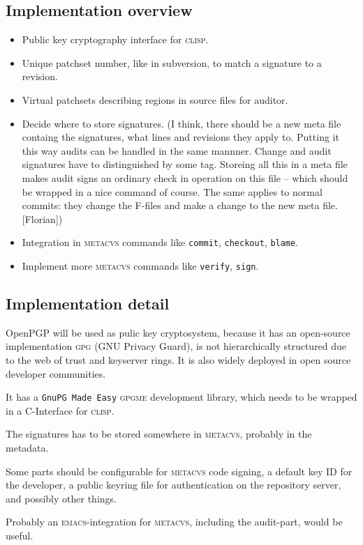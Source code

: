 \documentclass[fleqn, german, 10pt, a4paper]{article}
\begin{document}
\subsection{Implementation overview}
\begin{itemize}
\item Public key cryptography interface for \textsc{clisp}.
\item Unique patchset number, like in subversion, to match a signature to a revision.
\item Virtual patchsets describing regions in source files for auditor.
\item Decide where to store signatures.
(I think, there should be a new meta file containg the signatures, what
lines and revisions they apply to. Putting it this way audits can be handled
in the same mannner. Change and audit signatures have to distinguished by
some tag. Storeing all this in a meta file makes audit signs an
ordinary check in operation on this file -- which should be wrapped in
a nice command of course. The same applies to normal commits: they
change the F-files and make a change to the new meta file. [Florian])
\item Integration in \textsc{metacvs} commands like \texttt{commit},
\texttt{checkout}, \texttt{blame}.
\item Implement more \textsc{metacvs} commands like \texttt{verify},
\texttt{sign}.
\end{itemize}

\subsection{Implementation detail}
OpenPGP will be used as pulic key cryptosystem, because it has an
open-source implementation \textsc{gpg} (GNU Privacy Guard), is not
hierarchically structured due to the web of trust and keyserver rings.
It is also widely deployed in open source developer communities.

It has a \texttt{GnuPG Made Easy} \textsc{gpgme} development library,
which needs to be wrapped in a C-Interface for \textsc{clisp}.

The signatures has to be stored somewhere in \textsc{metacvs}, probably
in the metadata.

Some parts should be configurable for \textsc{metacvs} code signing,
a default key ID for the developer, a public keyring file for authentication
on the repository server, and possibly other things.

Probably an \textsc{emacs}-integration for \textsc{metacvs}, including the
audit-part, would be useful.
\end{document}

